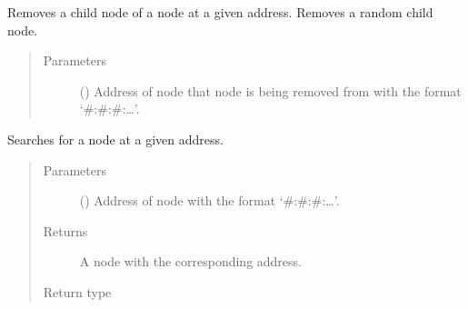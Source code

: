 \documentclass[letterpaper,10pt,english]{sphinxmanual}
\begin{document}
\begin{fulllineitems}
\begin{fulllineitems}
\begin{quote}
\begin{description}
\end{description}\end{quote}

\end{fulllineitems}


\begin{fulllineitems}
\label{\detokenize{index:ThresTree.ThresTree.removeChild}}
Removes a child node of a node at a given address. Removes a random child node.
\begin{quote}\begin{description}
\item[{Parameters}] \leavevmode
{} () \textendash{} Address of node that node is being removed from with the format ‘\#:\#:\#:…’.

\end{description}\end{quote}

\end{fulllineitems}


\begin{fulllineitems}
\label{\detokenize{index:ThresTree.ThresTree.search}}
Searches for a node at a given address.
\begin{quote}\begin{description}
\item[{Parameters}] \leavevmode
{} () \textendash{} Address of node with the format ‘\#:\#:\#:…’.

\item[{Returns}] \leavevmode
A node with the corresponding address.

\item[{Return type}] \leavevmode
{\hyperref[\detokenize{index:ThresTree.TreeNode}]{}}

\end{description}\end{quote}

\end{fulllineitems}


\end{fulllineitems}
\end{document}

